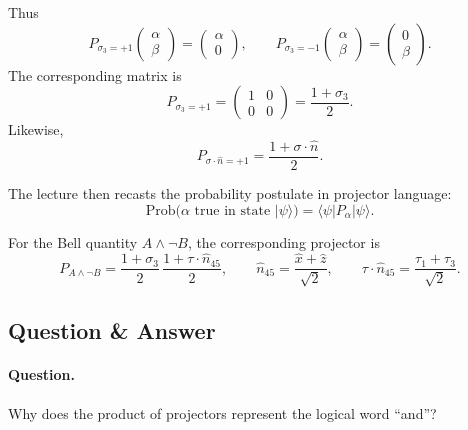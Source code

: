 Thus
\begin{equation}
P_{\sigma_3=+1}
\begin{pmatrix}
\alpha \\ \beta
\end{pmatrix}
=
\begin{pmatrix}
\alpha \\ 0
\end{pmatrix},
\qquad
P_{\sigma_3=-1}
\begin{pmatrix}
\alpha \\ \beta
\end{pmatrix}
=
\begin{pmatrix}
0 \\ \beta
\end{pmatrix}.
\end{equation}
The corresponding matrix is
\begin{equation}
P_{\sigma_3=+1}
=
\begin{pmatrix}
1 & 0 \\
0 & 0
\end{pmatrix}
=
\frac{1+\sigma_3}{2}.
\end{equation}
Likewise,
\begin{equation}
P_{\sigma\cdot \hat n = +1}
=
\frac{1+\sigma\cdot \hat n}{2}.
\end{equation}

The lecture then recasts the probability postulate in projector language:
\begin{equation}
\mathrm{Prob}(\alpha\text{ true in state }|\psi\rangle)
=
\langle \psi|P_\alpha|\psi\rangle.
\end{equation}

For the Bell quantity \(A\wedge \neg B\), the corresponding projector is
\begin{equation}
P_{A\wedge \neg B}
=
\frac{1+\sigma_3}{2}\,
\frac{1+\tau\cdot \hat n_{45}}{2},
\qquad
\hat n_{45}=\frac{\hat x+\hat z}{\sqrt{2}},
\qquad
\tau\cdot \hat n_{45}
=
\frac{\tau_1+\tau_3}{\sqrt{2}}.
\end{equation}

\subsection{Question \& Answer}

\paragraph{Question.} Why does the product of projectors represent the logical word ``and''?

